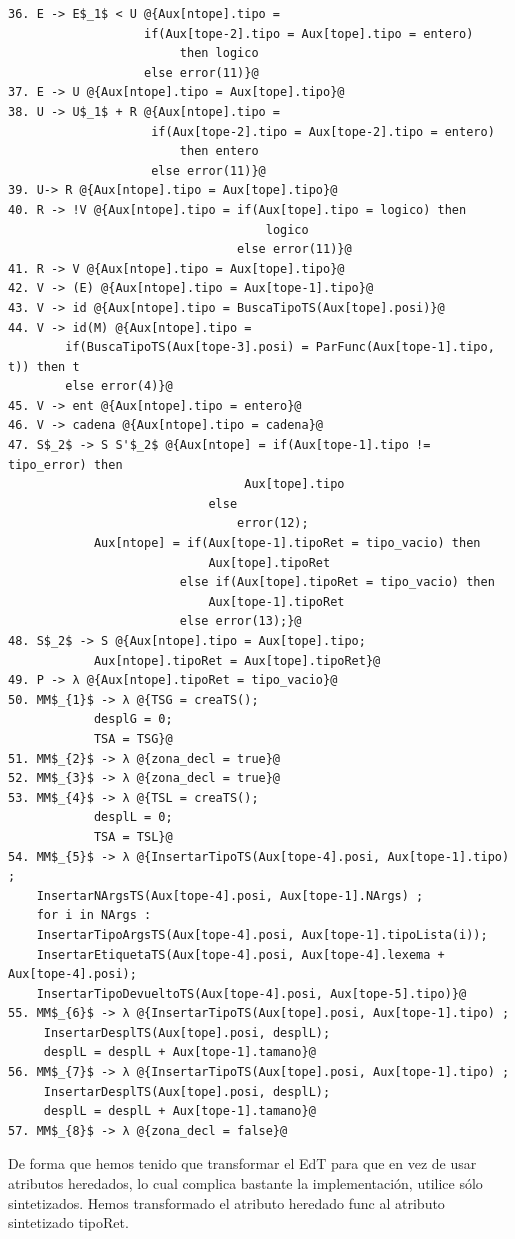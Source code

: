 \begin{lstlisting}[style=EdT]
36. E -> E$_1$ < U @{Aux[ntope].tipo =
                   if(Aux[tope-2].tipo = Aux[tope].tipo = entero)
                        then logico
                   else error(11)}@
37. E -> U @{Aux[ntope].tipo = Aux[tope].tipo}@
38. U -> U$_1$ + R @{Aux[ntope].tipo = 
					if(Aux[tope-2].tipo = Aux[tope-2].tipo = entero)
						then entero 
					else error(11)}@
39. U-> R @{Aux[ntope].tipo = Aux[tope].tipo}@
40. R -> !V @{Aux[ntope].tipo = if(Aux[tope].tipo = logico) then 
									logico
             					else error(11)}@
41. R -> V @{Aux[ntope].tipo = Aux[tope].tipo}@
42. V -> (E) @{Aux[ntope].tipo = Aux[tope-1].tipo}@
43. V -> id @{Aux[ntope].tipo = BuscaTipoTS(Aux[tope].posi)}@
44. V -> id(M) @{Aux[ntope].tipo = 
		if(BuscaTipoTS(Aux[tope-3].posi) = ParFunc(Aux[tope-1].tipo, t)) then t
		else error(4)}@
45. V -> ent @{Aux[ntope].tipo = entero}@
46. V -> cadena @{Aux[ntope].tipo = cadena}@
47. S$_2$ -> S S'$_2$ @{Aux[ntope] = if(Aux[tope-1].tipo != tipo_error) then
								 Aux[tope].tipo
							else 
								error(12);
			Aux[ntope] = if(Aux[tope-1].tipoRet = tipo_vacio) then 
							Aux[tope].tipoRet
						else if(Aux[tope].tipoRet = tipo_vacio) then 
							Aux[tope-1].tipoRet 
						else error(13);}@
48. S$_2$ -> S @{Aux[ntope].tipo = Aux[tope].tipo;
			Aux[ntope].tipoRet = Aux[tope].tipoRet}@
49. P -> λ @{Aux[ntope].tipoRet = tipo_vacio}@
50. MM$_{1}$ -> λ @{TSG = creaTS();
			desplG = 0;
			TSA = TSG}@
51. MM$_{2}$ -> λ @{zona_decl = true}@
52. MM$_{3}$ -> λ @{zona_decl = true}@
53. MM$_{4}$ -> λ @{TSL = creaTS();
			desplL = 0;
			TSA = TSL}@
54. MM$_{5}$ -> λ @{InsertarTipoTS(Aux[tope-4].posi, Aux[tope-1].tipo) ;
	InsertarNArgsTS(Aux[tope-4].posi, Aux[tope-1].NArgs) ;
	for i in NArgs :
	InsertarTipoArgsTS(Aux[tope-4].posi, Aux[tope-1].tipoLista(i));
	InsertarEtiquetaTS(Aux[tope-4].posi, Aux[tope-4].lexema + Aux[tope-4].posi); 
	InsertarTipoDevueltoTS(Aux[tope-4].posi, Aux[tope-5].tipo)}@
55. MM$_{6}$ -> λ @{InsertarTipoTS(Aux[tope].posi, Aux[tope-1].tipo) ;
     InsertarDesplTS(Aux[tope].posi, desplL);
     desplL = desplL + Aux[tope-1].tamano}@
56. MM$_{7}$ -> λ @{InsertarTipoTS(Aux[tope].posi, Aux[tope-1].tipo) ;
     InsertarDesplTS(Aux[tope].posi, desplL);
     desplL = desplL + Aux[tope-1].tamano}@
57. MM$_{8}$ -> λ @{zona_decl = false}@
\end{lstlisting}
\newpage
De forma que hemos tenido que transformar el EdT para que en vez de usar atributos heredados, lo cual complica bastante la implementación, utilice sólo sintetizados. Hemos transformado el atributo heredado func al atributo sintetizado tipoRet.

